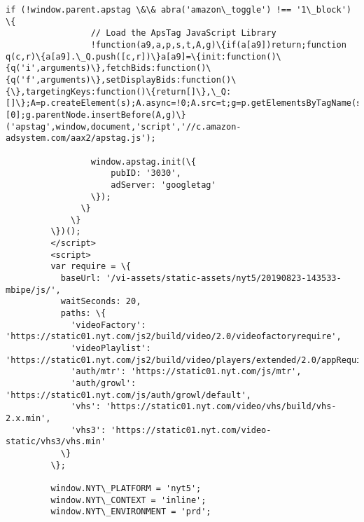\documentclass[11pt]{article}
\begin{document}
\begin{Verbatim}[commandchars=\\\{\}]
               if (!window.parent.apstag \&\& abra('amazon\_toggle') !== '1\_block') \{
                 // Load the ApsTag JavaScript Library
                 !function(a9,a,p,s,t,A,g)\{if(a[a9])return;function q(c,r)\{a[a9].\_Q.push([c,r])\}a[a9]=\{init:function()\{q('i',arguments)\},fetchBids:function()\{q('f',arguments)\},setDisplayBids:function()\{\},targetingKeys:function()\{return[]\},\_Q:[]\};A=p.createElement(s);A.async=!0;A.src=t;g=p.getElementsByTagName(s)[0];g.parentNode.insertBefore(A,g)\}('apstag',window,document,'script','//c.amazon-adsystem.com/aax2/apstag.js');
         
                 window.apstag.init(\{
                     pubID: '3030',
                     adServer: 'googletag'
                 \});
               \}
             \}
         \})();
         </script>
         <script>
         var require = \{
           baseUrl: '/vi-assets/static-assets/nyt5/20190823-143533-mbipe/js/',
           waitSeconds: 20,
           paths: \{
             'videoFactory': 'https://static01.nyt.com/js2/build/video/2.0/videofactoryrequire',
             'videoPlaylist': 'https://static01.nyt.com/js2/build/video/players/extended/2.0/appRequire',
             'auth/mtr': 'https://static01.nyt.com/js/mtr',
             'auth/growl': 'https://static01.nyt.com/js/auth/growl/default',
             'vhs': 'https://static01.nyt.com/video/vhs/build/vhs-2.x.min',
             'vhs3': 'https://static01.nyt.com/video-static/vhs3/vhs.min'
           \}
         \};
         
         window.NYT\_PLATFORM = 'nyt5';
         window.NYT\_CONTEXT = 'inline';
         window.NYT\_ENVIRONMENT = 'prd';
         

\end{Verbatim}
\end{document}
